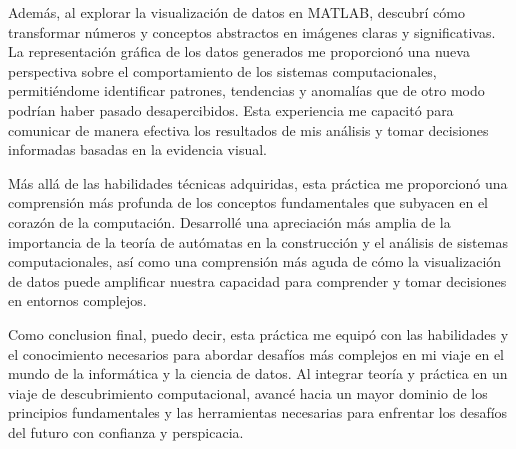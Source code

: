 \documentclass{article}
\begin{document}
Además, al explorar la visualización de datos en MATLAB, descubrí cómo transformar números y conceptos abstractos en imágenes claras y
significativas. La representación gráfica de los datos generados me proporcionó una nueva perspectiva sobre el comportamiento de los
sistemas computacionales, permitiéndome identificar patrones, tendencias y anomalías que de otro modo podrían haber pasado desapercibidos.
Esta experiencia me capacitó para comunicar de manera efectiva los resultados de mis análisis y tomar decisiones informadas basadas en
la evidencia visual.

Más allá de las habilidades técnicas adquiridas, esta práctica me proporcionó una comprensión más profunda de los conceptos
fundamentales que subyacen en el corazón de la computación. Desarrollé una apreciación más amplia de la importancia de la teoría de
autómatas en la construcción y el análisis de sistemas computacionales, así como una comprensión más aguda de cómo la visualización de
datos puede amplificar nuestra capacidad para comprender y tomar decisiones en entornos complejos.

Como conclusion final, puedo decir, esta práctica me equipó con las habilidades y el conocimiento necesarios para abordar desafíos más
complejos en mi viaje en el mundo de la informática y la ciencia de datos. Al integrar teoría y práctica en un viaje de descubrimiento
computacional, avancé hacia un mayor dominio de los principios fundamentales y las herramientas necesarias para enfrentar los desafíos
del futuro con confianza y perspicacia.


\newpage

\end{document}
